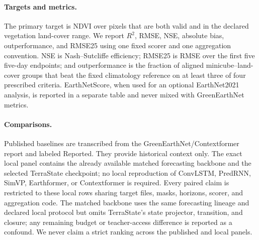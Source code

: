\documentclass[letterpaper]{article} %
\begin{document}
\paragraph{Targets and metrics.}
The primary target is NDVI over pixels that are both valid and in the declared
vegetation land-cover range. We report $R^2$, RMSE, NSE, absolute bias,
outperformance, and RMSE25 using one fixed scorer and one aggregation
convention. NSE is Nash--Sutcliffe efficiency; RMSE25 is RMSE over the first
five five-day endpoints; and outperformance is the fraction of aligned
minicube--land-cover groups that beat the fixed climatology reference on at
least three of four prescribed criteria. EarthNetScore, when used for an
optional EarthNet2021 analysis, is reported in a separate table and never
mixed with GreenEarthNet metrics.

\paragraph{Comparisons.}
Published baselines are transcribed from the GreenEarthNet/Contextformer report
\cite{benson2024multimodal} and labeled Reported. They provide historical
context only. The exact local panel contains the already available matched
forecasting backbone and the selected TerraState checkpoint; no local reproduction
of ConvLSTM, PredRNN, SimVP, Earthformer, or Contextformer is required. Every
paired claim is restricted to these local rows sharing target files, masks,
horizons, scorer, and aggregation code. The matched backbone uses the same forecasting
lineage and declared local protocol but omits TerraState's state projector,
transition, and closure; any remaining budget or teacher-access difference is
reported as a confound. We never claim a strict ranking across the published
and local panels.
\end{document}
